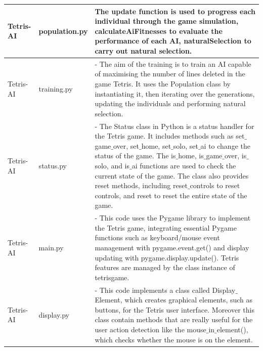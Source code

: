 \documentclass[conference]{IEEEtran}
\begin{document}
\begin{center}
\begin{tabular}{ | m{1.3cm} | m{1.7cm} | m{4.7cm} | } 

    Tetris-AI & 
    population.py &
     The update function is used to progress each individual through the game simulation, calculateAiFitnesses to evaluate the performance of each AI, naturalSelection to carry out natural selection.\\
      
    \hline
    Tetris-AI & 
    training.py & 
    - The aim of the training is to train an AI capable of maximising the number of lines deleted in the game Tetris. It uses the Population class by instantiating it, then iterating over the generations, updating the individuals and performing natural selection.\\
     \hline
     Tetris-AI & 
    status.py & 
    - The Status class in Python is a status handler for the Tetris game. It includes methods such as set$\_$game$\_$over, set$\_$home, set$\_$solo, set$\_$ai to change the status of the game. The is$\_$home, is$\_$game$\_$over, is$\_$solo, and is$\_$ai functions are used to check the current state of the game. The class also provides reset methods, including reset$\_$controls to reset controls, and reset to reset the entire state of the game.\\
     \hline
    Tetris-AI & 
    main.py & 
    - This code uses the Pygame library to implement the Tetris game, integrating essential Pygame functions such as keyboard/mouse event management with pygame.event.get() and display updating with pygame.display.update(). Tetris features are managed by the class instance of tetrisgame. \\
    \hline
    Tetris-AI & 
    display.py & 
    - This code implements a class called Display$\_$Element, which creates graphical elements, such as buttons, for the Tetris user interface. Moreover this class contain methods that are really useful for the user action detection like the  mouse$\_$in$\_$element(), which checks whether the mouse is on the element.\\

\end{tabular}
\end{center}
\end{document}
